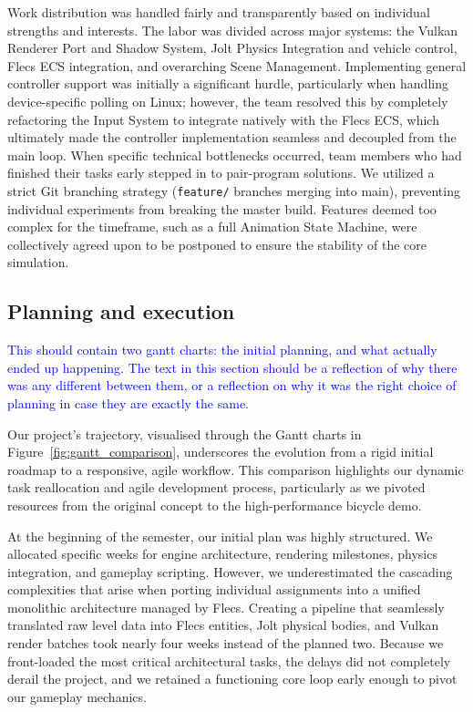 \documentclass[acmtog, nonacm]{acmart}
\begin{document}
Work distribution was handled fairly and transparently based on individual strengths and interests. The labor was divided across major systems: the Vulkan Renderer Port and Shadow System, Jolt Physics Integration and vehicle control, Flecs ECS integration, and overarching Scene Management. Implementing general controller support was initially a significant hurdle, particularly when handling device-specific polling on Linux; however, the team resolved this by completely refactoring the Input System to integrate natively with the Flecs ECS, which ultimately made the controller implementation seamless and decoupled from the main loop. When specific technical bottlenecks occurred, team members who had finished their tasks early stepped in to pair-program solutions. We utilized a strict Git branching strategy (\texttt{feature/} branches merging into main), preventing individual experiments from breaking the master build. Features deemed too complex for the timeframe, such as a full Animation State Machine, were collectively agreed upon to be postponed to ensure the stability of the core simulation.

\subsection{Planning and execution}
\textcolor{blue}{This should contain two gantt charts: the initial planning, and what actually ended up happening.
The text in this section should be a reflection of why there was any different between them, or a reflection on why it was the right choice of planning in case they are exactly the same. }



Our project's trajectory, visualised through the Gantt charts in Figure~\ref{fig:gantt_comparison}, underscores the evolution from a rigid initial roadmap to a responsive, agile workflow. This comparison highlights our dynamic task reallocation and agile development process, particularly as we pivoted resources from the original concept to the high-performance bicycle demo.

At the beginning of the semester, our initial plan was highly structured. We allocated specific weeks for engine architecture, rendering milestones, physics integration, and gameplay scripting. However, we underestimated the cascading complexities that arise when porting individual assignments into a unified monolithic architecture managed by Flecs. Creating a pipeline that seamlessly translated raw level data into Flecs entities, Jolt physical bodies, and Vulkan render batches took nearly four weeks instead of the planned two. Because we front-loaded the most critical architectural tasks, the delays did not completely derail the project, and we retained a functioning core loop early enough to pivot our gameplay mechanics.
\end{document}
